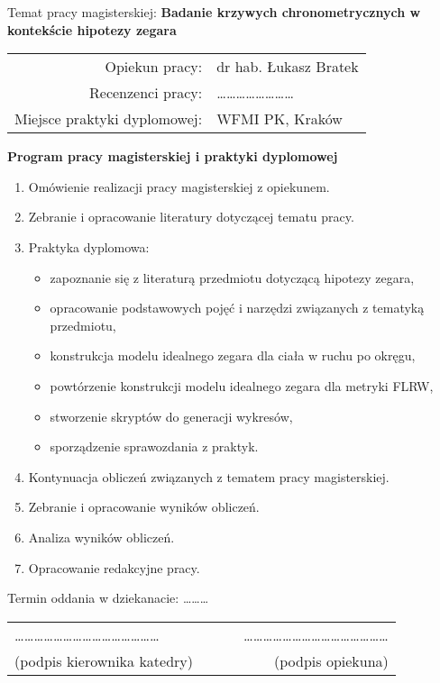 Temat pracy magisterskiej:
{\bf Badanie krzywych chronometrycznych w kontekście hipotezy zegara}\\

\begin{tabular}{rl}

Opiekun pracy:                  & dr hab. Łukasz Bratek\\
Recenzenci pracy:               & \dots \dots \dots \dots \dots \dots \dots \dots\\
Miejsce praktyki dyplomowej:    & WFMI PK, Kraków\\
\end{tabular}

\begin{center}
{\bf Program pracy magisterskiej i praktyki dyplomowej}
\end{center}

\begin{enumerate}
\item Omówienie realizacji pracy magisterskiej z opiekunem.
\item Zebranie i opracowanie literatury dotyczącej tematu pracy.
\item Praktyka dyplomowa:
\begin{itemize}
\item zapoznanie się z literaturą przedmiotu dotyczącą hipotezy zegara,
\item opracowanie podstawowych pojęć i narzędzi związanych z tematyką przedmiotu,
\item konstrukcja modelu idealnego zegara dla ciała w ruchu po okręgu,
\item powtórzenie konstrukcji modelu idealnego zegara dla metryki FLRW,
\item stworzenie skryptów do generacji wykresów,
\item sporządzenie sprawozdania z praktyk.
\end{itemize}
\item Kontynuacja obliczeń związanych z tematem pracy magisterskiej.
\item Zebranie i opracowanie wyników obliczeń.
\item Analiza wyników obliczeń.
\item Opracowanie redakcyjne pracy.
\end{enumerate}


\noindent
Termin oddania w dziekanacie: \dots \dots \dots\\[1cm]

\begin{center}
\begin{tabular}{lcr}
\dots\dots\dots\dots\dots\dots\dots\dots\dots\dots\dots\dots\dots\dots\dots & ~~~ &
\dots\dots\dots\dots\dots\dots\dots\dots\dots\dots\dots\dots\dots\dots\dots \\
(podpis kierownika katedry) & & (podpis opiekuna) \\
\end{tabular}
\end{center}


